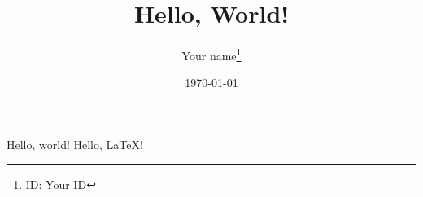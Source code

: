 \documentclass[12pt]{article}
\title{Hello, World!}
\author{Your name\thanks{ID: Your ID}}
\date{\today}
\begin{document}
    \maketitle
    Hello, world! Hello, \LaTeX!
\end{document}
